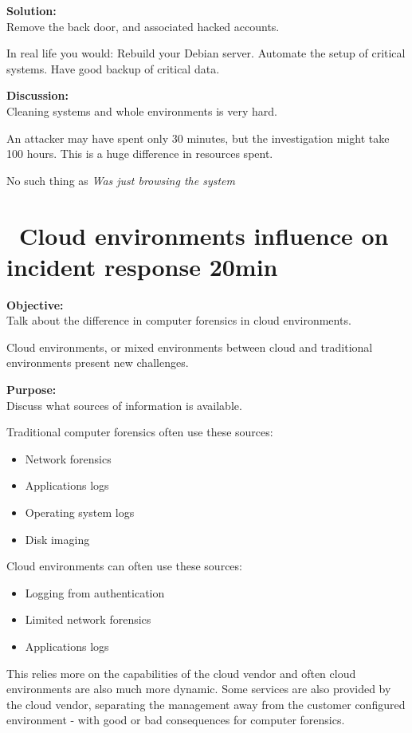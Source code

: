 \documentclass[a4paper,11pt,notitlepage]{report}
\begin{document}
{\bf Solution:}\\
Remove the back door, and associated hacked accounts.

In real life you would:
Rebuild your Debian server.
Automate the setup of critical systems.
Have good backup of critical data.

{\bf Discussion:}\\
Cleaning systems and whole environments is very hard.

An attacker may have spent only 30 minutes, but the investigation might take 100 hours. This is a huge difference in resources spent.

No such thing as \emph{Was just browsing the system}


\chapter{\faInfoCircle\ Cloud environments influence on incident response 20min}
\label{ex:cloud-incident-response}

{\bf Objective:}\\
Talk about the difference in computer forensics in cloud environments.

Cloud environments, or mixed environments between cloud and traditional environments present new challenges.

{\bf Purpose:}\\
Discuss what sources of information is available.

Traditional computer forensics often use these sources:
\begin{itemize}
\item Network forensics
\item Applications logs
\item Operating system logs
\item Disk imaging
\end{itemize}

Cloud environments can often use these sources:

\begin{itemize}
\item Logging from authentication
\item Limited network forensics
\item Applications logs
\end{itemize}

This relies more on the capabilities of the cloud vendor and often cloud environments are also much more dynamic. Some services are also provided by the cloud vendor, separating the management away from the customer configured environment - with good or bad consequences for computer forensics.
\end{document}
